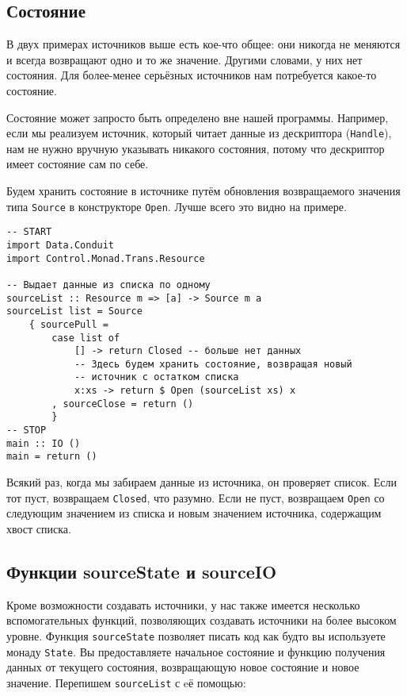 \subsection{Состояние}
В двух примерах источников выше есть кое-что общее: они никогда не меняются и всегда возвращают одно и то же
значение. Другими словами, у них нет состояния. Для более-менее серьёзных источников нам
потребуется какое-то состояние.

\begin{remark}
Состояние может запросто быть определено вне нашей программы. Например, если мы
реализуем источник, который читает данные из дескриптора (\lstinline{Handle}), нам не нужно вручную
указывать никакого состояния, потому что дескриптор имеет состояние сам по себе.
\end{remark}

Будем хранить состояние в источнике путём обновления возвращаемого значения типа
\lstinline=Source= в конструкторе \lstinline=Open=. Лучше всего это видно на
примере.

\begin{lstlisting}
-- START
import Data.Conduit
import Control.Monad.Trans.Resource

-- Выдает данные из списка по одному
sourceList :: Resource m => [a] -> Source m a
sourceList list = Source
    { sourcePull =
        case list of
            [] -> return Closed -- больше нет данных
            -- Здесь будем хранить состояние, возвращая новый 
            -- источник с остатком списка
            x:xs -> return $ Open (sourceList xs) x
        , sourceClose = return ()
        }
-- STOP
main :: IO ()
main = return ()
\end{lstlisting}

Всякий раз, когда мы забираем данные из источника, он проверяет список. Если тот пуст,
возвращаем \lstinline=Closed=, что разумно. Если не пуст, возвращаем \lstinline=Open= со
следующим значением из
списка и новым значением источника, содержащим хвост списка.

\subsection{Функции sourceState и sourceIO}
Кроме возможности создавать источники, у нас также имеется несколько вспомогательных функций,
позволяющих создавать источники на более высоком уровне. Функция \lstinline=sourceState=
позволяет писать
код как будто вы используете монаду \lstinline=State=. Вы предоставляете начальное
состояние и
функцию получения данных от текущего состояния, возвращающую новое состояние и
новое значение. Перепишем \lstinline=sourceList= с eё помощью:

